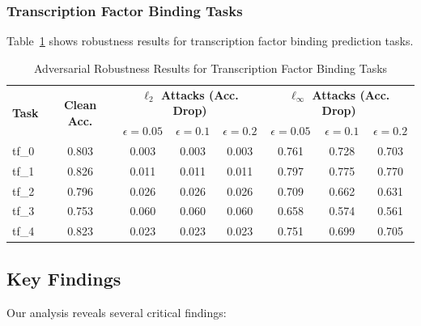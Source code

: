 \documentclass{article} %
\begin{document}
\subsubsection{Transcription Factor Binding Tasks}

Table~\ref{tab:tf_results} shows robustness results for transcription factor binding prediction tasks.

\begin{table}[h]
\centering
\caption{Adversarial Robustness Results for Transcription Factor Binding Tasks}
\label{tab:tf_results}
\begin{tabular}{lccccccc}
\toprule
\multirow{2}{*}{\textbf{Task}} & \multirow{2}{*}{\textbf{Clean Acc.}} & \multicolumn{3}{c}{\textbf{$\ell_2$ Attacks (Acc. Drop)}} & \multicolumn{3}{c}{\textbf{$\ell_\infty$ Attacks (Acc. Drop)}} \\
\cmidrule(lr){3-5} \cmidrule(lr){6-8}
& & $\epsilon=0.05$ & $\epsilon=0.1$ & $\epsilon=0.2$ & $\epsilon=0.05$ & $\epsilon=0.1$ & $\epsilon=0.2$ \\
\midrule
tf\_0 & 0.803 & 0.003 & 0.003 & 0.003 & 0.761 & 0.728 & 0.703 \\
tf\_1 & 0.826 & 0.011 & 0.011 & 0.011 & 0.797 & 0.775 & 0.770 \\
tf\_2 & 0.796 & 0.026 & 0.026 & 0.026 & 0.709 & 0.662 & 0.631 \\
tf\_3 & 0.753 & 0.060 & 0.060 & 0.060 & 0.658 & 0.574 & 0.561 \\
tf\_4 & 0.823 & 0.023 & 0.023 & 0.023 & 0.751 & 0.699 & 0.705 \\
\bottomrule
\end{tabular}
\end{table}

\subsection{Key Findings}

Our analysis reveals several critical findings:
\end{document}
